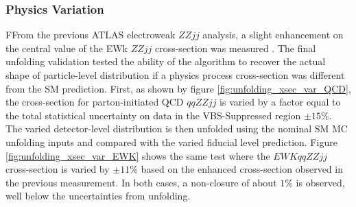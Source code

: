 \subsubsection{Physics Variation}
FFrom the previous ATLAS electroweak $ZZjj$ analysis, a slight enhancement on the central value of the EWk $ZZjj$ cross-section was measured \cite{ATLASZZjj}. The final unfolding validation tested the ability of the algorithm to recover the actual shape of particle-level distribution if a physics process cross-section was different from the SM prediction. First, as shown by figure \ref{fig:unfolding_xsec_var_QCD}, the cross-section for parton-initiated QCD $qqZZjj$ is varied by a factor equal to the total statistical uncertainty on data in the VBS-Suppressed region $\pm  15\%$. The varied detector-level distribution is then unfolded using the nominal SM MC unfolding inputs and compared with the varied fiducial level prediction. Figure \ref{fig:unfolding_xsec_var_EWK} shows the same test where the $EWK qqZZjj$ cross-section is varied by $\pm 11\%$ based on the enhanced cross-section observed in the previous measurement. In both cases, a non-closure of about $1\%$ is observed, well below the uncertainties from unfolding.

